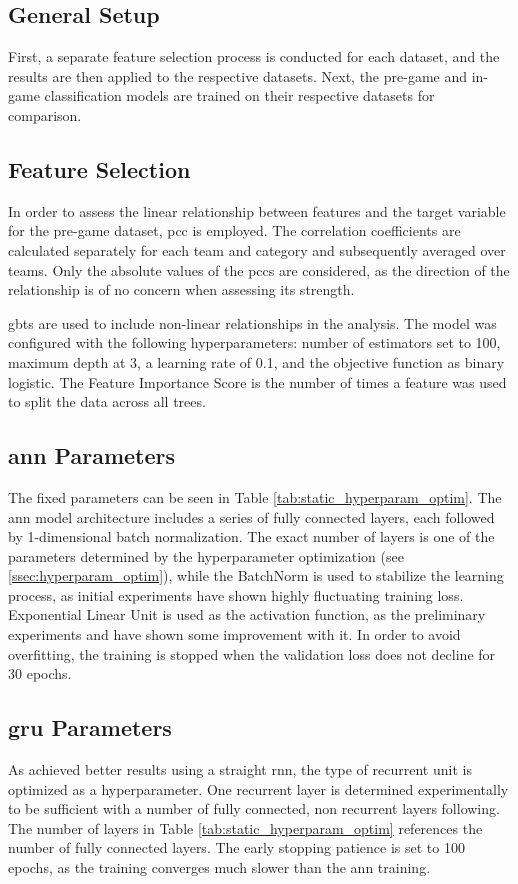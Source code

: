 \documentclass[12pt, a4paper, headinclude, twoside, plainheadsepline, open=right, numbers=noenddot, hidelinks, toc=listof, toc=bibliography]{scrreprt}
\begin{document}
\subsection{General Setup}
\label{ssec:general_setup}
First, a separate feature selection process is conducted for each dataset, and the results are then applied to the respective datasets. 
Next, the pre-game and in-game classification models are trained on their respective datasets for comparison.

\subsection{Feature Selection}
\label{ssec:fs_setup}
In order to assess the linear relationship between features and the target variable for the pre-game dataset, \acl{pcc} is employed.
The correlation coefficients are calculated separately for each team and category and subsequently averaged over teams.
Only the absolute values of the \acp{pcc} are considered, as the direction of the relationship is of no concern when assessing its strength.

\Aclp{gbt} are used to include non-linear relationships in the analysis.
The model was configured with the following hyperparameters: number of estimators set to 100, maximum depth at 3, a learning rate of 0.1, and the objective function as binary logistic.
The Feature Importance Score is the number of times a feature was used to split the data across all trees.

\subsection{\Ac{ann} Parameters}
The fixed parameters can be seen in Table \ref{tab:static_hyperparam_optim}.
The \ac{ann} model architecture includes a series of fully connected layers, each followed by 1-dimensional batch normalization.
The exact number of layers is one of the parameters determined by the hyperparameter optimization (see \ref{ssec:hyperparam_optim}), while the BatchNorm is used to stabilize the learning process, as initial experiments have shown highly fluctuating training loss.
Exponential Linear Unit is used as the activation function, as the preliminary experiments and \citeauthor{doUsingMachineLearning2021} \cite{doUsingMachineLearning2021} have shown some improvement with it.
In order to avoid overfitting, the training is stopped when the validation loss does not decline for 30 epochs.

\subsection{\Ac{gru} Parameters}
As \citeauthor{silvaContinuousOutcomePrediction2018} \cite{silvaContinuousOutcomePrediction2018} achieved better results using a straight \ac{rnn},  the type of recurrent unit is optimized as a hyperparameter.
One recurrent layer is determined experimentally to be sufficient with a number of fully connected, non recurrent layers following.
The number of layers in Table \ref{tab:static_hyperparam_optim} references the number of fully connected layers.
The early stopping patience is set to 100 epochs, as the training converges much slower than the \ac{ann} training.
\end{document}
